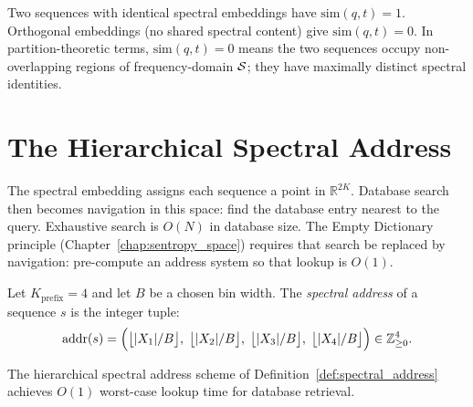 \begin{remark}
Two sequences with identical spectral embeddings have $\mathrm{sim}(q,t) = 1$.
Orthogonal embeddings (no shared spectral content) give $\mathrm{sim}(q,t) = 0$.
In partition-theoretic terms, $\mathrm{sim}(q,t) = 0$ means the two sequences
occupy non-overlapping regions of frequency-domain $\mathcal{S}$; they have
maximally distinct spectral identities.
\end{remark}

\section{The Hierarchical Spectral Address}
\label{sec:spectral_address}

The spectral embedding assigns each sequence a point in $\mathbb{R}^{2K}$.
Database search then becomes navigation in this space: find the database
entry nearest to the query. Exhaustive search is $O(N)$ in database size.
The Empty Dictionary principle (Chapter~\ref{chap:sentropy_space}) requires
that search be replaced by navigation: pre-compute an address system so that
lookup is $O(1)$.

\begin{definition}
\label{def:spectral_address}
Let $K_{\mathrm{prefix}} = 4$ and let $B$ be a chosen bin width. The
\emph{spectral address} of a sequence $s$ is the integer tuple:
\begin{equation}
  \mathrm{addr}(s) = \Bigl(
    \bigl\lfloor |X_1|/B \bigr\rfloor,\;
    \bigl\lfloor |X_2|/B \bigr\rfloor,\;
    \bigl\lfloor |X_3|/B \bigr\rfloor,\;
    \bigl\lfloor |X_4|/B \bigr\rfloor
  \Bigr) \in \mathbb{Z}_{\geq 0}^4.
  \label{eq:spectral_address}
\end{equation}
\end{definition}

\begin{proposition}
\label{prop:o1_lookup}
The hierarchical spectral address scheme of Definition~\ref{def:spectral_address}
achieves $O(1)$ worst-case lookup time for database retrieval.
\end{proposition}

